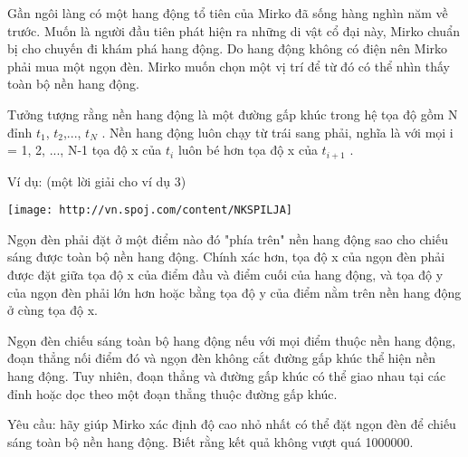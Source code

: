 Gần ngôi làng có một hang động tổ tiên của Mirko đã sống hàng nghìn năm về trước. Muốn là người đầu tiên phát hiện ra những di vật cổ đại này, Mirko chuẩn bị cho chuyến đi khám phá hang động. Do hang động không có điện nên Mirko phải mua một ngọn đèn. Mirko muốn chọn một vị trí để từ đó có thể nhìn thấy toàn bộ nền hang động.

Tưởng tượng rằng nền hang động là một đường gấp khúc trong hệ tọa độ gồm N đỉnh $t_{1}$, $t_{2}$,..., $t_{N}$ . Nền hang động luôn chạy từ trái sang phải, nghĩa là với mọi i = 1, 2, ..., N-1 tọa độ x của $t_{i}$ luôn bé hơn tọa độ x của $t_{i+1}$ .

Ví dụ: (một lời giải cho ví dụ 3)


\texttt{[image: http://vn.spoj.com/content/NKSPILJA]}

Ngọn đèn phải đặt ở một điểm nào đó "phía trên" nền hang động sao cho chiếu sáng được toàn bộ nền hang động. Chính xác hơn, tọa độ x của ngọn đèn phải được đặt giữa tọa độ x của điểm đầu và điểm cuối của hang động, và tọa độ y của ngọn đèn phải lớn hơn hoặc bằng tọa độ y của điểm nằm trên nền hang động ở cùng tọa độ x.

Ngọn đèn chiếu sáng toàn bộ hang động nếu với mọi điểm thuộc nền hang động, đoạn thẳng nối điểm đó và ngọn đèn không cắt đường gấp khúc thể hiện nền hang động. Tuy nhiên, đoạn thẳng và đường gấp khúc có thể giao nhau tại các đỉnh hoặc dọc theo một đoạn thẳng thuộc đường gấp khúc.

Yêu cầu: hãy giúp Mirko xác định độ cao nhỏ nhất có thể đặt ngọn đèn để chiếu sáng toàn bộ nền hang động. Biết rằng kết quả không vượt quá 1000000.
